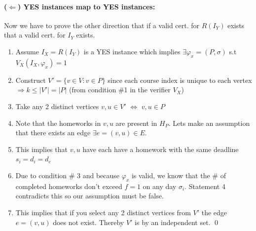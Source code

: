 \documentclass[11pt]{article}
\begin{document}
\paragraph{($\Leftarrow$) YES instances map to YES instances:}
%
Now we have to prove the other direction that if a valid cert. for $R(I_Y)$ exists that a valid cert. for $I_Y$ exists. \\
\begin{enumerate}
    \item Assume $I_X= R(I_Y)$ is a YES instance which implies $\exists \varphi_x=(P,\sigma)$ s.t $V_X(I_X,\varphi_x)=1$ 
    \item Construct $V' = \{v\in V: v\in P\}$ since each course index is unique to each vertex $\Rightarrow k \leq |V'| = |P|$ (from condition \#1 in the verifier $V_X$)
    \item Take any 2 distinct vertices $v,u \in V'$ $\Leftrightarrow$ $v,u \in P$
    \item Note that the homeworks in $v,u$ are present in $H_P$. Lets make an assumption that there exists an edge $\exists e = (v,u) \in E$. 
    \item This implies that $v,u$ have each have a homework with the same deadline $s_i=d_i=d_e$
    \item Due to condition \# 3  and because $\varphi_x$ is valid, we know that the \# of completed homeworks don't exceed $f=1$ on any day $\sigma_i$.
        Statement 4 contradicts this so our assumption must be false.
    \item This implies that if you select any 2 distinct vertices from $V'$ the edge $e=(v,u)$ does not exist. Thereby $V'$ is by 
        an independent set. \qed
\end{enumerate}

\vspace{1cm}
\end{document}
